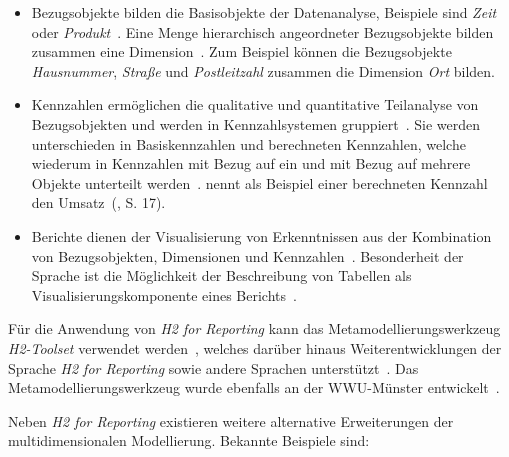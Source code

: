 \documentclass[
  language=german, %
  type=bachelor,%
  ngerman
]{isthesis}
\begin{document}
\begin{content}
	\begin{itemize}

		\item Bezugsobjekte bilden die Basisobjekte der Datenanalyse, Beispiele
		sind \textit{Zeit} oder \textit{Produkt}~\cite[][S.  5]{becker2007h2}. Eine
		Menge hierarchisch angeordneter Bezugsobjekte bilden zusammen eine
		Dimension~\cite[][S.  88]{becker2012fachkonzeptionelle}. Zum Beispiel
		können die Bezugsobjekte \textit{Hausnummer}, \textit{Straße} und
		\textit{Postleitzahl} zusammen die Dimension \textit{Ort} bilden.

		\item Kennzahlen ermöglichen die qualitative und quantitative Teilanalyse
		von Bezugsobjekten und werden in Kennzahlsystemen
		gruppiert~\cite[][S.88]{becker2012fachkonzeptionelle}. Sie werden
		unterschieden in Basiskennzahlen und berechneten Kennzahlen, welche
		wiederum in Kennzahlen mit Bezug auf ein und mit Bezug auf mehrere Objekte
		unterteilt werden~\cite[][S.  15]{becker2007h2}.
		\textsc{\citeauthor{becker2007h2}} nennt als Beispiel einer berechneten
		Kennzahl den Umsatz~(\cite{becker2007h2}, S. 17).

		\item Berichte dienen der Visualisierung von Erkenntnissen aus der
		Kombination von Bezugsobjekten, Dimensionen und Kennzahlen~\cite[][S.
		23]{becker2007h2}. Besonderheit der Sprache ist die Möglichkeit der
		Beschreibung von Tabellen als Visualisierungskomponente eines
		Berichts~\cite[][S. 86]{becker2012fachkonzeptionelle}.

	\end{itemize}

	Für die Anwendung von \textit{H2 for Reporting} kann das
	Metamodellierungswerkzeug \textit{H2-Toolset} verwendet werden~\cite[][S.
	33]{fleischer2013konstruktion}, welches darüber hinaus Weiterentwicklungen
	der Sprache \textit{H2 for Reporting} sowie andere Sprachen
	unterstützt~\cite[][S. 86]{becker2012fachkonzeptionelle}. Das
	Metamodellierungswerkzeug wurde ebenfalls an der \acrshort{WWU}-Münster
	entwickelt~\cite[][S.  34]{becker2007h2}.


	Neben \textit{H2 for Reporting} existieren weitere alternative Erweiterungen
	der multidimensionalen Modellierung. Bekannte Beispiele sind:


\end{content}
\end{document}
